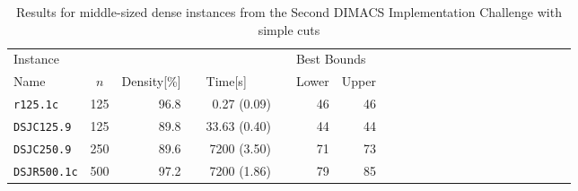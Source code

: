 \documentclass[11pt,a4paper]{article}
\begin{document}
\begin{table}[tb]
\caption{Results for middle-sized dense instances from the Second DIMACS Implementation Challenge with simple cuts \label{tbl:middleDMCSCuts}}
\begin{center}
{\small
\begin{tabular}{lrrrrrrrrrrrrrrrrrrrrrr}
\toprule
\multicolumn{3}{l}{Instance}	&&		&&\multicolumn{2}{l}{Best Bounds}		\\	\cline{1-3} \cline{7-8}
\multicolumn{1}{l}{Name}	&\multicolumn{1}{c}{$n$}	&\multicolumn{1}{l}{Density[\%]}
&&\multicolumn{1}{l}{Time[s]}
&&Lower	&Upper	\\
\midrule
\texttt{r125.1c}		&	125	&96.8	&&	0.27 (0.09)			&&	46	&	46 	\\	
\texttt{DSJC125.9}	&	125	&89.8	&&	33.63	 (0.40)		&&	44	&	44 	\\	
\texttt{DSJC250.9}	&	250	&89.6	&&	7200 (3.50)		&&	71 	&	73 	\\	
\texttt{DSJR500.1c}	&	500	&97.2	&&	7200 (1.86)		&&	79	&	85 	\\
\bottomrule
\end{tabular}
}
\end{center}
\end{table}
\end{document}
